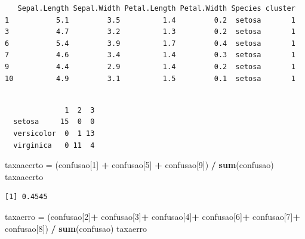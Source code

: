 \documentclass[12pt,brazil,oneside]{book}
\newenvironment{Shaded}{\begin{snugshade}}{\end{snugshade}}
\newcommand{\DecValTok}[1]{\textcolor[rgb]{0.00,0.00,0.81}{#1}}
\newcommand{\KeywordTok}[1]{\textcolor[rgb]{0.13,0.29,0.53}{\textbf{#1}}}
\newcommand{\NormalTok}[1]{#1}
\newcommand{\OperatorTok}[1]{\textcolor[rgb]{0.81,0.36,0.00}{\textbf{#1}}}
\newcommand{\StringTok}[1]{\textcolor[rgb]{0.31,0.60,0.02}{#1}}
\begin{document}
\begin{verbatim}
   Sepal.Length Sepal.Width Petal.Length Petal.Width Species cluster
1           5.1         3.5          1.4         0.2  setosa       1
3           4.7         3.2          1.3         0.2  setosa       1
6           5.4         3.9          1.7         0.4  setosa       1
7           4.6         3.4          1.4         0.3  setosa       1
9           4.4         2.9          1.4         0.2  setosa       1
10          4.9         3.1          1.5         0.1  setosa       1
\end{verbatim}

\begin{Shaded}
\end{Shaded}

\begin{verbatim}
            
              1  2  3
  setosa     15  0  0
  versicolor  0  1 13
  virginica   0 11  4
\end{verbatim}

\begin{Shaded}
\begin{Highlighting}[]
\NormalTok{taxaacerto =}\StringTok{ }\NormalTok{(confusao[}\DecValTok{1}\NormalTok{] }\OperatorTok{+}\StringTok{ }\NormalTok{confusao[}\DecValTok{5}\NormalTok{] }\OperatorTok{+}\StringTok{ }\NormalTok{confusao[}\DecValTok{9}\NormalTok{]) }\OperatorTok{/}\StringTok{ }\KeywordTok{sum}\NormalTok{(confusao)}
\NormalTok{taxaacerto}
\end{Highlighting}
\end{Shaded}

\begin{verbatim}
[1] 0.4545
\end{verbatim}

\begin{Shaded}
\begin{Highlighting}[]
\NormalTok{taxaerro =}\StringTok{ }\NormalTok{(confusao[}\DecValTok{2}\NormalTok{]}\OperatorTok{+}\StringTok{ }
\StringTok{            }\NormalTok{confusao[}\DecValTok{3}\NormalTok{]}\OperatorTok{+}
\StringTok{            }\NormalTok{confusao[}\DecValTok{4}\NormalTok{]}\OperatorTok{+}
\StringTok{            }\NormalTok{confusao[}\DecValTok{6}\NormalTok{]}\OperatorTok{+}
\StringTok{            }\NormalTok{confusao[}\DecValTok{7}\NormalTok{]}\OperatorTok{+}
\StringTok{            }\NormalTok{confusao[}\DecValTok{8}\NormalTok{]) }\OperatorTok{/}\StringTok{ }\KeywordTok{sum}\NormalTok{(confusao)}
\NormalTok{taxaerro}
\end{Highlighting}
\end{Shaded}
\end{document}
